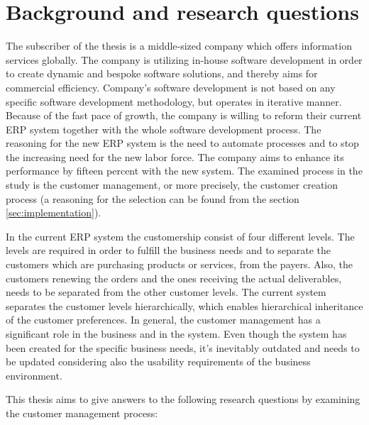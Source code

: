 \documentclass[12pt,a4paper,oneside,pdftex]{report}
\begin{document}
\section{Background and research questions}
\label{sec:background}
The subscriber of the thesis is a middle-sized company which offers information services globally. The company is utilizing in-house software development in order to create dynamic and bespoke software solutions, and thereby aims for commercial efficiency. Company's software development is not based on any specific software development methodology, but operates in iterative manner. Because of the fast pace of growth, the company is willing to reform their current ERP system together with the whole software development process. The reasoning for the new ERP system is the need to automate processes and to stop the increasing need for the new labor force. The company aims to enhance its performance by fifteen percent with the new system. The examined process in the study is the customer management, or more precisely, the customer creation process  (a reasoning for the selection can be found from the section \ref{sec:implementation}). 

In the current ERP system the customership consist of four different levels. The levels are required in order to fulfill the business needs and to separate the customers which are purchasing products or services, from the payers. Also, the customers renewing the orders and the ones receiving the actual deliverables, needs to be separated from the other customer levels. The current system separates the customer levels hierarchically, which enables hierarchical inheritance of the customer preferences. In general, the customer management has a significant role in the business and in the system. Even though the system has been created for the specific business needs, it's inevitably outdated and needs to be updated considering also the usability requirements of the business environment.

This thesis aims to give answers to the following research questions by examining the customer management process:
\end{document}
